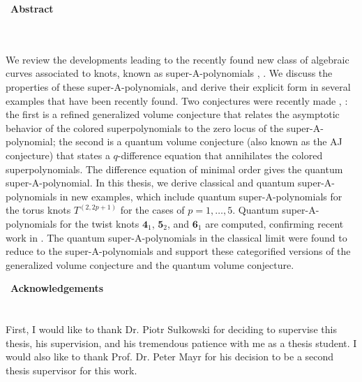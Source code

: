 \documentclass[a4paper,titlepage,twoside]{book}
\begin{document}
\newpage
\thispagestyle{empty}
$ \, $
\newpage
\textbf{\Large{Abstract}}\normalsize
\\
\\
\\
\hspace*{0.5cm}


We review the developments leading to the recently found new class of algebraic curves associated to knots, known as super-A-polynomials \cite{bib:FGS2012}, \cite{FujiSulkowski2013}.  We discuss the properties of these super-A-polynomials, and derive their explicit form in several examples that have been recently found.  Two conjectures were recently made \cite{bib:FGS2012}, \cite{FujiSulkowski2013}: the first is a refined generalized volume conjecture that relates the asymptotic behavior of the colored superpolynomials to the zero locus of the super-A-polynomial; the second is a quantum volume conjecture (also known as the AJ conjecture) that states a $q$-difference equation that annihilates the colored superpolynomials.  The difference equation of minimal order gives the quantum super-A-polynomial.  In this thesis, we derive classical and quantum super-A-polynomials in new examples, which include quantum super-A-polynomials for the torus knots $T^{(2,2p+1)}$ for the cases of $p=1, \dots , 5$.  Quantum super-A-polynomials for the twist knots $\mathbf{4}_1$, $\mathbf{5}_2$, and $\mathbf{6}_1$ are computed, confirming recent work in \cite{NRZ2013}.   The quantum super-A-polynomials in the classical limit were found to reduce to the super-A-polynomials and support these categorified versions of the generalized volume conjecture and the quantum volume conjecture.



\newpage
\thispagestyle{empty}
$ \, $
\newpage
\textbf{\Large{Acknowledgements}}
\\
\\
\\
\hspace*{0,5cm}
First, I would like to thank Dr. Piotr Su\l kowski for deciding to supervise this thesis, his supervision, and his tremendous patience with me as a thesis student.  I would also like to thank Prof. Dr. Peter Mayr for his decision to be a second thesis supervisor for this work.  
\end{document}
